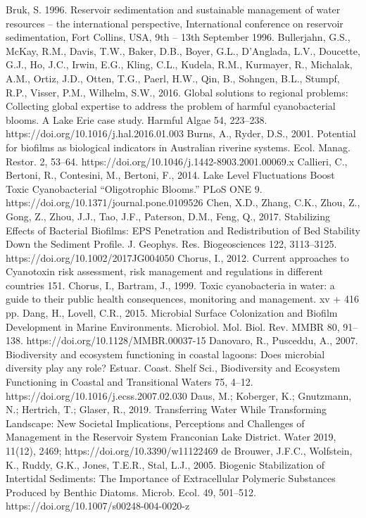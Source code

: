 \begin{thebibliography}{}
Bruk, S. 1996. Reservoir sedimentation and sustainable management of water resources – the international perspective, International conference on reservoir sedimentation, Fort Collins, USA, 9th – 13th September 1996.
Bullerjahn, G.S., McKay, R.M., Davis, T.W., Baker, D.B., Boyer, G.L., D’Anglada, L.V., Doucette, G.J., Ho, J.C., Irwin, E.G., Kling, C.L., Kudela, R.M., Kurmayer, R., Michalak, A.M., Ortiz, J.D., Otten, T.G., Paerl, H.W., Qin, B., Sohngen, B.L., Stumpf, R.P., Visser, P.M., Wilhelm, S.W., 2016. Global solutions to regional problems: Collecting global expertise to address the problem of harmful cyanobacterial blooms. A Lake Erie case study. Harmful Algae 54, 223–238. https://doi.org/10.1016/j.hal.2016.01.003
Burns, A., Ryder, D.S., 2001. Potential for biofilms as biological indicators in Australian riverine systems. Ecol. Manag. Restor. 2, 53–64. https://doi.org/10.1046/j.1442-8903.2001.00069.x
Callieri, C., Bertoni, R., Contesini, M., Bertoni, F., 2014. Lake Level Fluctuations Boost Toxic Cyanobacterial “Oligotrophic Blooms.” PLoS ONE 9. https://doi.org/10.1371/journal.pone.0109526
Chen, X.D., Zhang, C.K., Zhou, Z., Gong, Z., Zhou, J.J., Tao, J.F., Paterson, D.M., Feng, Q., 2017. Stabilizing Effects of Bacterial Biofilms: EPS Penetration and Redistribution of Bed Stability Down the Sediment Profile. J. Geophys. Res. Biogeosciences 122, 3113–3125. https://doi.org/10.1002/2017JG004050
Chorus, I., 2012. Current approaches to Cyanotoxin risk assessment, risk management and regulations in different countries 151.
Chorus, I., Bartram, J., 1999. Toxic cyanobacteria in water: a guide to their public health consequences, monitoring and management. xv + 416 pp.
Dang, H., Lovell, C.R., 2015. Microbial Surface Colonization and Biofilm Development in Marine Environments. Microbiol. Mol. Biol. Rev. MMBR 80, 91–138. https://doi.org/10.1128/MMBR.00037-15
Danovaro, R., Pusceddu, A., 2007. Biodiversity and ecosystem functioning in coastal lagoons: Does microbial diversity play any role? Estuar. Coast. Shelf Sci., Biodiversity and Ecosystem Functioning in Coastal and Transitional Waters 75, 4–12. https://doi.org/10.1016/j.ecss.2007.02.030
Daus, M.; Koberger, K.; Gnutzmann, N.; Hertrich, T.; Glaser, R., 2019. Transferring Water While Transforming Landscape: New Societal Implications, Perceptions and Challenges of Management in the Reservoir System Franconian Lake District. Water 2019, 11(12), 2469; https://doi.org/10.3390/w11122469
de Brouwer, J.F.C., Wolfstein, K., Ruddy, G.K., Jones, T.E.R., Stal, L.J., 2005. Biogenic Stabilization of Intertidal Sediments: The Importance of Extracellular Polymeric Substances Produced by Benthic Diatoms. Microb. Ecol. 49, 501–512. https://doi.org/10.1007/s00248-004-0020-z

\end{thebibliography}
